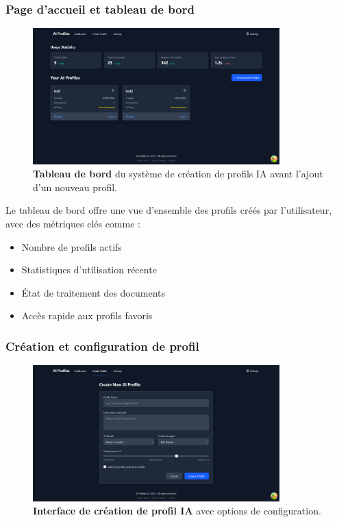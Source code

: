 \subsubsection{Page d'accueil et tableau de bord}

\begin{figure}[H]
  \centering
  \includegraphics[width=0.85\textwidth,keepaspectratio]{pfe-pics/ai-profile-creation/dashboared_befor_adding_a_new_ai_profile.png}
  \caption{\textbf{Tableau de bord} du système de création de profils IA avant l'ajout d'un nouveau profil.}
  \label{fig:ai_dashboard}
\end{figure}

Le tableau de bord offre une vue d'ensemble des profils créés par l'utilisateur, avec des métriques clés comme :

\begin{itemize}
  \item Nombre de profils actifs
  \item Statistiques d'utilisation récente
  \item État de traitement des documents
  \item Accès rapide aux profils favoris
\end{itemize}

\subsubsection{Création et configuration de profil}

\begin{figure}[H]
  \centering
  \includegraphics[width=0.85\textwidth,keepaspectratio]{pfe-pics/ai-profile-creation/creating_and_ai_prifile.png}
  \caption{\textbf{Interface de création de profil IA} avec options de configuration.}
  \label{fig:profile_creation}
\end{figure}

